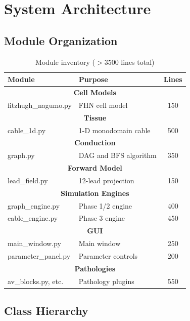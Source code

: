 \documentclass[12pt,oneside,a4paper]{book}
\begin{document}
\chapter{System Architecture}

\section{Module Organization}

\begin{table}[htb]
\centering
\begin{tabularx}{\textwidth}{|l|X|c|}
\hline
\textbf{Module} & \textbf{Purpose} & \textbf{Lines} \\
\hline
\multicolumn{3}{|c|}{\textbf{Cell Models}} \\
\hline
fitzhugh\_nagumo.py & FHN cell model & 150 \\
\hline
\multicolumn{3}{|c|}{\textbf{Tissue}} \\
\hline
cable\_1d.py & 1-D monodomain cable & 500 \\
\hline
\multicolumn{3}{|c|}{\textbf{Conduction}} \\
\hline
graph.py & DAG and BFS algorithm & 350 \\
\hline
\multicolumn{3}{|c|}{\textbf{Forward Model}} \\
\hline
lead\_field.py & 12-lead projection & 150 \\
\hline
\multicolumn{3}{|c|}{\textbf{Simulation Engines}} \\
\hline
graph\_engine.py & Phase 1/2 engine & 400 \\
cable\_engine.py & Phase 3 engine & 450 \\
\hline
\multicolumn{3}{|c|}{\textbf{GUI}} \\
\hline
main\_window.py & Main window & 250 \\
parameter\_panel.py & Parameter controls & 200 \\
\hline
\multicolumn{3}{|c|}{\textbf{Pathologies}} \\
\hline
av\_blocks.py, etc. & Pathology plugins & 550 \\
\hline
\end{tabularx}
\caption{Module inventory ($>3500$ lines total)}
\label{tab:modules}
\end{table}

\section{Class Hierarchy}
\end{document}
